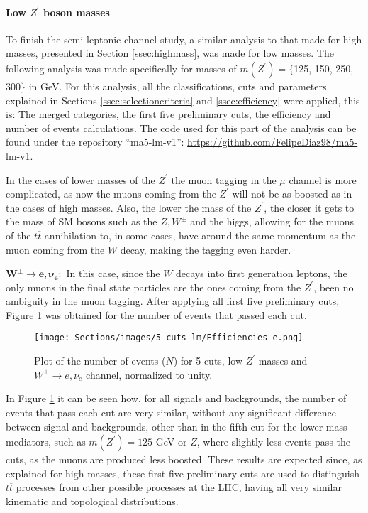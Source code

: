 \paragraph{Low $Z^{\prime}$ boson masses}\label{ssec:lowmass}

To finish the semi-leptonic channel study, a similar analysis to that made for high masses, presented in Section \ref{ssec:highmass}, was made for low masses. The following analysis was made specifically for masses of $m(Z^{\prime}) = \{$125, 150, 250, 300$\}$ in GeV. For this analysis, all the classifications, cuts and parameters explained in Sections \ref{ssec:selectioncriteria} and \ref{ssec:efficiency} were applied, this is: The merged categories, the first five preliminary cuts, the efficiency and number of events calculations. The code used for this part of the analysis can be found under the repository ``ma5-lm-v1'': \url{https://github.com/FelipeDiaz98/ma5-lm-v1}.

In the cases of lower masses of the $Z^{\prime}$ the muon tagging in the $\mu$ channel is more complicated, as now the muons coming from the $Z^{\prime}$ will not be as boosted as in the cases of high masses. Also, the lower the mass of the $Z^{\prime}$, the closer it gets to the mass of SM bosons such as the $Z, W^{\pm}$ and the higgs, allowing for the muons of the $t\overline t$ annihilation to, in some cases, have around the same momentum as the muon coming from the $W$ decay, making the tagging even harder. 

$\bm{W^{\pm} \rightarrow e, \nu_e:}$ In this case, since the $W$ decays into first generation leptons, the only muons in the final state particles are the ones coming from the $Z^{\prime}$, been no ambiguity in the muon tagging. After applying all first five preliminary cuts, Figure \ref{5cutsLm_Eff_e} was obtained for the number of events that passed each cut.

\begin{figure}[ht!]
    \centering
    \texttt{[image: Sections/images/5\_cuts\_lm/Efficiencies\_e.png]}
    \caption{Plot of the number of events ($N$) for 5 cuts, low $Z^{\prime}$ masses and $W^{\pm}\rightarrow e, \nu_e$ channel, normalized to unity.}
    \label{5cutsLm_Eff_e}
\end{figure}

In Figure \ref{5cutsLm_Eff_e} it can be seen how, for all signals and backgrounds, the number of events that pass each cut are very similar, without any significant difference between signal and backgrounds, other than in the fifth cut for the lower mass mediators, such as $m(Z^{\prime}) = 125$ GeV or $Z$, where slightly less events pass the cuts, as the muons are produced less boosted. These results are expected since, as explained for high masses, these first five preliminary cuts are used to distinguish $t\overline t$ processes from other possible processes at the LHC, having all very similar kinematic and topological distributions.

